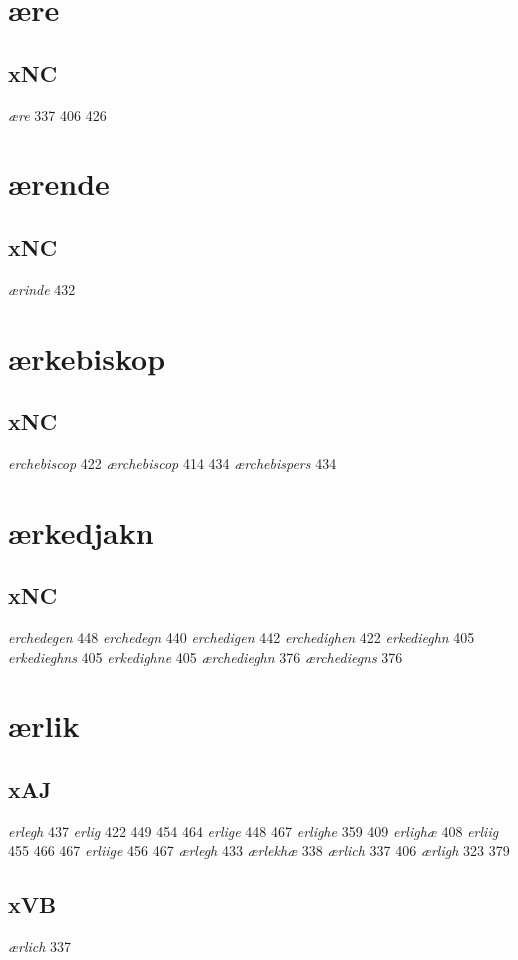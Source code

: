 \documentclass[a4paper,twocolumn]{article}
\begin{document}
\section{ære}
\label{sec:orgb4e87e0}
\subsection{xNC}
\label{sec:org5d0a7db}
\emph{ære} 337 406 426 
\section{ærende}
\label{sec:org4c28a2b}
\subsection{xNC}
\label{sec:org4f11950}
\emph{ærinde} 432 
\section{ærkebiskop}
\label{sec:org9af2d8c}
\subsection{xNC}
\label{sec:org45c9869}
\emph{erchebiscop} 422 \emph{ærchebiscop} 414 434 \emph{ærchebispers} 434 
\section{ærkedjakn}
\label{sec:orged10ad7}
\subsection{xNC}
\label{sec:org6124e78}
\emph{erchedegen} 448 \emph{erchedegn} 440 \emph{erchedigen} 442 \emph{erchedighen} 422 \emph{erkedieghn} 405 \emph{erkedieghns} 405 \emph{erkedighne} 405 \emph{ærchedieghn} 376 \emph{ærchediegns} 376 
\section{ærlik}
\label{sec:org21b58a4}
\subsection{xAJ}
\label{sec:org1ec3208}
\emph{erlegh} 437 \emph{erlig} 422 449 454 464 \emph{erlige} 448 467 \emph{erlighe} 359 409 \emph{erlighæ} 408 \emph{erliig} 455 466 467 \emph{erliige} 456 467 \emph{ærlegh} 433 \emph{ærlekhæ} 338 \emph{ærlich} 337 406 \emph{ærligh} 323 379 
\subsection{xVB}
\label{sec:org866518d}
\emph{ærlich} 337 
\end{document}
